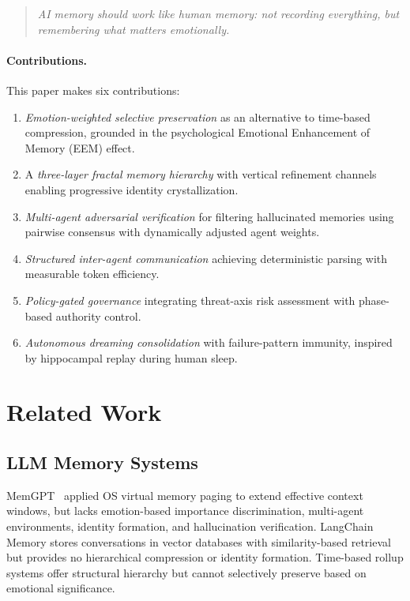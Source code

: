 \documentclass[11pt,a4paper]{article}
\begin{document}
\begin{quote}
\emph{AI memory should work like human memory: not recording everything, but remembering what matters emotionally.}
\end{quote}

\paragraph{Contributions.} This paper makes six contributions:
\begin{enumerate}[leftmargin=*, itemsep=2pt]
  \item \emph{Emotion-weighted selective preservation} as an alternative to time-based compression, grounded in the psychological Emotional Enhancement of Memory (EEM) effect.
  \item A \emph{three-layer fractal memory hierarchy} with vertical refinement channels enabling progressive identity crystallization.
  \item \emph{Multi-agent adversarial verification} for filtering hallucinated memories using pairwise consensus with dynamically adjusted agent weights.
  \item \emph{Structured inter-agent communication} achieving deterministic parsing with measurable token efficiency.
  \item \emph{Policy-gated governance} integrating threat-axis risk assessment with phase-based authority control.
  \item \emph{Autonomous dreaming consolidation} with failure-pattern immunity, inspired by hippocampal replay during human sleep.
\end{enumerate}

\section{Related Work}

\subsection{LLM Memory Systems}
MemGPT~\citep{packer2023memgpt} applied OS virtual memory paging to extend effective context windows, but lacks emotion-based importance discrimination, multi-agent environments, identity formation, and hallucination verification. LangChain Memory stores conversations in vector databases with similarity-based retrieval but provides no hierarchical compression or identity formation. Time-based rollup systems offer structural hierarchy but cannot selectively preserve based on emotional significance.
\end{document}
